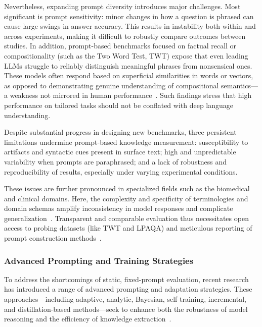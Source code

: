 \documentclass[sigconf]{acmart}
\begin{document}
Nevertheless, expanding prompt diversity introduces major challenges. Most significant is prompt sensitivity: minor changes in how a question is phrased can cause large swings in answer accuracy. This results in instability both within and across experiments, making it difficult to robustly compare outcomes between studies. In addition, prompt-based benchmarks focused on factual recall or compositionality (such as the Two Word Test, TWT) expose that even leading LLMs struggle to reliably distinguish meaningful phrases from nonsensical ones. These models often respond based on superficial similarities in words or vectors, as opposed to demonstrating genuine understanding of compositional semantics---a weakness not mirrored in human performance~\cite{ref96}. Such findings stress that high performance on tailored tasks should not be conflated with deep language understanding.

Despite substantial progress in designing new benchmarks, three persistent limitations undermine prompt-based knowledge measurement: susceptibility to artifacts and syntactic cues present in surface text; high and unpredictable variability when prompts are paraphrased; and a lack of robustness and reproducibility of results, especially under varying experimental conditions.

These issues are further pronounced in specialized fields such as the biomedical and clinical domains. Here, the complexity and specificity of terminologies and domain schemas amplify inconsistency in model responses and complicate generalization~\cite{ref94,ref95}. Transparent and comparable evaluation thus necessitates open access to probing datasets (like TWT and LPAQA) and meticulous reporting of prompt construction methods~\cite{ref96,ref98}.

\subsubsection{Advanced Prompting and Training Strategies}

To address the shortcomings of static, fixed-prompt evaluation, recent research has introduced a range of advanced prompting and adaptation strategies. These approaches---including adaptive, analytic, Bayesian, self-training, incremental, and distillation-based methods---seek to enhance both the robustness of model reasoning and the efficiency of knowledge extraction~\cite{ref1,ref4,ref6,ref49,ref56,ref57,ref68,ref86,ref103}.
\end{document}
